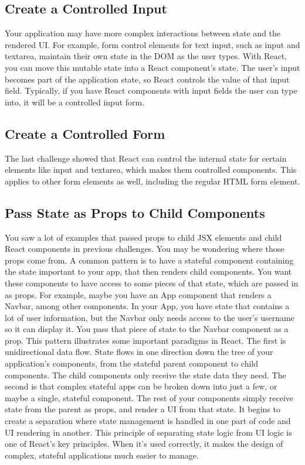 \documentclass{article}%
\begin{document}
%
\subsection{Create a Controlled Input}%
\label{subsec:CreateaControlledInput}%
Your application may have more complex interactions between state and the rendered UI. For example, form control elements for text input, such as input and textarea, maintain their own state in the DOM as the user types. With React, you can move this mutable state into a React component's state. The user's input becomes part of the application state, so React controls the value of that input field. Typically, if you have React components with input fields the user can type into, it will be a controlled input form.\newline%

%
\subsection{Create a Controlled Form}%
\label{subsec:CreateaControlledForm}%
The last challenge showed that React can control the internal state for certain elements like input and textarea, which makes them controlled components. This applies to other form elements as well, including the regular HTML form element.\newline%

%
\subsection{Pass State as Props to Child Components}%
\label{subsec:PassStateasPropstoChildComponents}%
You saw a lot of examples that passed props to child JSX elements and child React components in previous challenges. You may be wondering where those props come from. A common pattern is to have a stateful component containing the state important to your app, that then renders child components. You want these components to have access to some pieces of that state, which are passed in as props.\newline%
For example, maybe you have an App component that renders a Navbar, among other components. In your App, you have state that contains a lot of user information, but the Navbar only needs access to the user's username so it can display it. You pass that piece of state to the Navbar component as a prop.\newline%
This pattern illustrates some important paradigms in React. The first is unidirectional data flow. State flows in one direction down the tree of your application's components, from the stateful parent component to child components. The child components only receive the state data they need. The second is that complex stateful apps can be broken down into just a few, or maybe a single, stateful component. The rest of your components simply receive state from the parent as props, and render a UI from that state. It begins to create a separation where state management is handled in one part of code and UI rendering in another. This principle of separating state logic from UI logic is one of React's key principles. When it's used correctly, it makes the design of complex, stateful applications much easier to manage.\newline%
\end{document}
